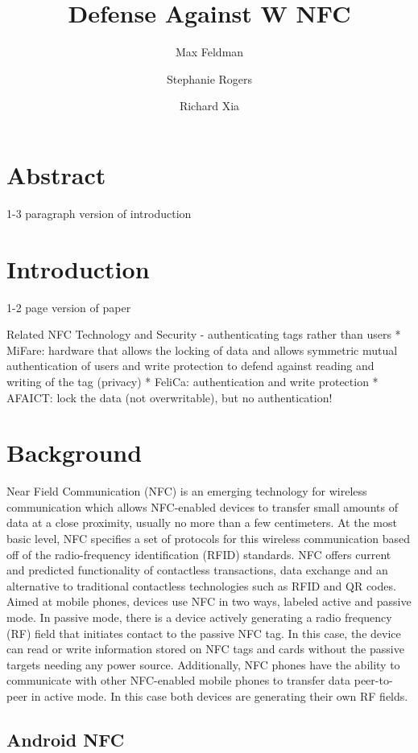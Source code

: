 \documentclass[12pt]{article}
\begin{document}
\title{Defense Against W NFC}
\author{Max Feldman \and Stephanie Rogers \and Richard Xia}
\maketitle

\section{Abstract}
1-3 paragraph version of introduction

\section{Introduction}
1-2 page version of paper



Related NFC Technology and Security - authenticating tags rather than users
* MiFare: hardware that allows the locking of data and allows symmetric mutual authentication of users and write protection to defend against reading and writing of the tag (privacy)
* FeliCa: authentication and write protection 
* AFAICT: lock the data (not overwritable), but no authentication!

\section{Background}
Near Field Communication (NFC) is an emerging technology for wireless communication which allows NFC-enabled devices to transfer small amounts of data at a close proximity, usually no more than a few centimeters. At the most basic level, NFC specifies a set of protocols for this wireless communication based off of the radio-frequency identification (RFID) standards. NFC offers current and predicted functionality of contactless transactions, data exchange and an alternative to traditional contactless technologies such as RFID and QR codes. Aimed at mobile phones, devices use NFC in two ways, labeled active and passive mode. In passive mode, there is a device actively generating a radio frequency (RF) field that initiates contact to the passive NFC tag. In this case, the device can read or write information stored on NFC tags and cards without the passive targets needing any power source. Additionally, NFC phones have the ability to communicate with other NFC-enabled mobile phones to transfer data peer-to-peer in active mode. In this case both devices are generating their own RF fields.

\subsection{Android NFC}
\end{document}
